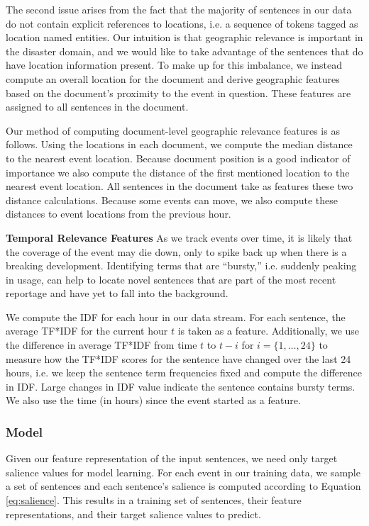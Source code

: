 The second issue arises from the fact that the majority of sentences in our 
data do not contain explicit references to locations, i.e. a sequence of 
tokens tagged as location named entities. Our intuition is that geographic 
relevance is important in the disaster domain, and we would like to take 
advantage of the sentences that do have location information present. To make 
up for this imbalance, we instead compute an overall location for the document
and derive geographic features based on the document's proximity to the event
in question. These features are assigned to all sentences in the document.


Our method of computing document-level geographic relevance features is as 
follows. Using the locations in each document, we compute the median distance 
to the nearest event location. Because document position is a good indicator 
of importance we also compute the distance of the first mentioned location to 
the nearest event location. All sentences in the document take as features 
these two distance calculations. Because some events can move, we also compute
these distances to event locations from the previous hour.


\textbf{Temporal Relevance Features}
As we track events over time, it is likely that the coverage of the event 
may die down, only to spike back up when there is a breaking development.
Identifying terms that are ``bursty,'' i.e. suddenly peaking in usage,
can help to locate novel sentences that are part of the most recent reportage
and have yet to fall into the background.

We compute the IDF for each hour in our data stream. For each sentence, the 
average TF*IDF for the current hour $t$ is taken as a feature. Additionally, 
we use the difference in average TF*IDF from time $t$ to $t-i$ for 
$i = \{1, \ldots, 24\}$ to measure how the TF*IDF scores for the sentence have
changed over the last 24 hours, i.e. we keep the sentence term frequencies 
fixed and compute the difference in IDF. Large changes in IDF value indicate 
the sentence contains bursty terms.
We also use the time (in hours) since the event started as a feature.


\subsubsection{Model}


Given our feature representation of the input sentences, we need only target 
salience values for model learning. For each event in our training data, we 
sample a set of sentences and  each sentence's salience is computed according 
to Equation \ref{eq:salience}. This results in a training set of sentences, 
their feature representations, and their target salience values to predict.


